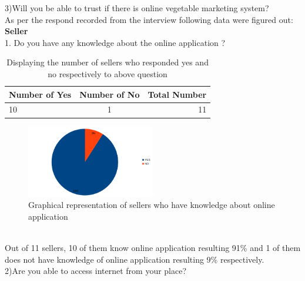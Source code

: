 \documentclass[12pt]{report}
\begin{document}
\begin{normalsize}
3)Will you be able to trust if there is online vegetable marketing system?\newline\\[0.1cm]

\newpage
As per the respond recorded from the interview following data were figured out:\newline\\[0.1cm]
{\bfseries Seller }\newline\\
1. Do you have any knowledge about the online application ? \newline\\[0.1cm]
\begin{table}[h]       %
		\centering
		\begin{tabular}{ | l | c | r | } \hline
		\textbf{Number of Yes} & \textbf{Number of No} & \textbf{Total Number} \\ \hline			
		10 & 1 & 11 \\ \hline
		\end{tabular}
		\caption{Displaying the number of sellers who responded yes and no respectively to above question}
		\label{1.0}
	    \end{table}
\begin{figure}[h]       %
	\centering
	\includegraphics[width=0.5\textwidth]{seller 1.png} 
	\caption{Graphical representation of sellers who have knowledge about online application }
	\label{myLabel}		%
	\end{figure}
\newline\\[0.1cm]Out of 11 sellers, 10 of them know online application resulting 91\% and 1 of them does not have knowledge of online application resulting 9\% respectively.\newline\\[0.1cm]
2)Are you able to access internet from your place? \newline\\[0.1cm]

\end{normalsize}
\end{document}
